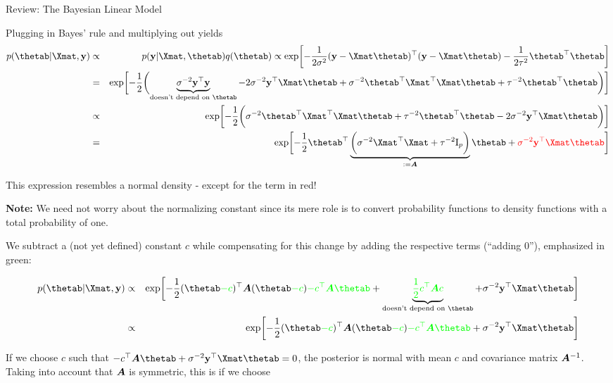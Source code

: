 \begin{vbframe}{Review: The Bayesian Linear Model}
\begin{footnotesize}
Plugging in Bayes' rule and multiplying out yields
\begin{eqnarray*}
p(\thetab | \Xmat, \ydat) &\propto& p(\ydat | \Xmat, \thetab) q(\thetab) \propto \exp\biggl[-\frac{1}{2\sigma^2}(\ydat - \Xmat\thetab)^\top(\ydat - \Xmat\thetab)-\frac{1}{2\tau^2}\thetab^\top\thetab\biggr] \\
&=& \exp\biggl[-\frac{1}{2}\biggl(\underbrace{\sigma^{-2}\ydat^\top\ydat}_{\text{doesn't depend on } \thetab} - 2 \sigma^{-2} \ydat^\top \Xmat \thetab + \sigma^{-2}\thetab^\top \Xmat^\top \Xmat \thetab  + \tau^{-2} \thetab^\top\thetab \biggr)\biggr] \\
&\propto& \exp\biggl[-\frac{1}{2}\biggl(\sigma^{-2}\thetab^\top \Xmat^\top \Xmat \thetab  + \tau^{-2} \thetab^\top\thetab  - 2 \sigma^{-2} \ydat^\top \Xmat \thetab \biggr)\biggr] \\
&=& \exp\biggl[-\frac{1}{2}\thetab^\top\underbrace{\biggl(\sigma^{-2} \Xmat^\top \Xmat + \tau^{-2} \id_p \biggr)}_{:= \Amat} \thetab + \textcolor{red}{\sigma^{-2} \ydat^\top \Xmat \thetab}\biggr]
\end{eqnarray*}

This expression resembles a normal density - except for the term in red!

\framebreak

\textbf{Note:} We need not worry about the normalizing constant since its mere role is to convert probability functions to density functions with a total probability of one.


We subtract a (not yet defined) constant $c$ while compensating for this change by adding the respective terms (\enquote{adding $0$}), emphasized in green:

\begin{eqnarray*}
	p(\thetab | \Xmat, \ydat) &\propto&  \exp\biggl[-\frac{1}{2}(\thetab \textcolor{green}{- c})^\top\Amat  (\thetab \textcolor{green}{- c}) \textcolor{green}{- c^\top \Amat \thetab} + \underbrace{\textcolor{green}{\frac{1}{2}c^\top\Amat c}}_{\text{doesn't depend on } \thetab} +\sigma^{-2} \ydat^\top \Xmat \thetab\biggr] \\
	&\propto& \exp\biggl[-\frac{1}{2}(\thetab \textcolor{green}{- c})^\top\Amat  (\thetab \textcolor{green}{- c}) \textcolor{green}{- c^\top \Amat \thetab} +\sigma^{-2} \ydat^\top \Xmat \thetab\biggr]
\end{eqnarray*}

If we choose $c$ such that $- c^\top \Amat \thetab +\sigma^{-2} \ydat^\top \Xmat \thetab = 0$, the posterior is normal with mean $c$ and covariance matrix $\bm{A}^{-1}$. Taking into account that $\bm{A}$ is symmetric, this is if we choose


\end{footnotesize}
\end{vbframe}
